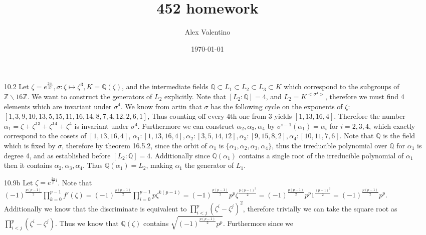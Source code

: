 \documentclass[12pt, letterpaper]{article}
\date{\today}
\author{Alex Valentino}
\title{452 homework}
\newcommand{\Z}{\mathbb{Z}}
\newcommand{\Q}{\mathbb{Q}}
\begin{document}
\begin{enumerate}
	\item[10.2] Let $\zeta = e^{\frac{2\pi i}{17}},
	\sigma : \zeta \mapsto \zeta^3, K = \Q(\zeta)$,
	and the intermediate fields $\Q \subset L_1 \subset L_2 \subset L_3 \subset K$ which correspond to the subgroups of $\Z \backslash 16 \Z$.
	We want to construct the generators of $L_2$ explicitly.  
	Note that $[L_2:\Q] = 4$, and $L_2 = K^{<\sigma^4>}$, therefore
	we must find 4 elements which are invariant under $\sigma^4$.
	We know from artin that $\sigma$ has the following cycle on 
	the exponents of $\zeta$: 
	$[1, 3, 9, 10, 13, 5, 15, 11, 16, 14, 8, 7, 4, 12, 2, 6, 1]$,
	Thus counting off every 4th one from $3$ yields 
	$[1,13,16,4]$.  Therefore the number 
	$\alpha_1 = \zeta + \zeta^{13} + \zeta^{14} + \zeta^4$ is 
	invariant under $\sigma^4$.  Furthermore we can construct 
	$\alpha_2, \alpha_3, \alpha_4$ by $\sigma^{i-1}(\alpha_1) =
	\alpha_i$ for $i=2,3,4$, which exactly correspond to the 
	cosets of $[1,13,16,4]$, 
	$\alpha_1: [1,13,16,4], \alpha_2: [3, 5, 14, 12], 
	\alpha_3: [9, 15, 8, 2], \alpha_4: [10, 11, 7, 6]$.
	Note that $\Q$ is the field which is fixed by $\sigma$,
	therefore by theorem 16.5.2, since the orbit of $\alpha_1$ 
	is $\{\alpha_1,\alpha_2,\alpha_3,\alpha_4\}$, thus 
	the irreducible polynomial over $\Q$ for $\alpha_1$ is 
	degree 4, and as established before $[L_2:\Q] = 4$.  
	Additionally since $\Q(\alpha_1)$ contains a single root 
	of the irreducible polynomial of $\alpha_1$ then it contains 
	$\alpha_2,\alpha_3,\alpha_4$.  Thus $\Q(\alpha_1) = L_2$, 
	making $\alpha_1$ the generator of $L_1$.  
	\iffalse Note that
	in the intermediate field $L_1$ we have the elements 
	corresponding to $l_1: [1, 9, 13, 15, 16, 8, 4, 2]$ and 
	$l_2: [3, 10, 5, 11, 14, 7, 12, 6]$, therefore we 
	only need $\alpha_1, \alpha_2$ and we can obtain 
	$\alpha_3 = l_1 - \alpha_1, \alpha_4 = l_2 - \alpha_2$.  
	Thus the irreducible polynomial is $(x-\alpha_1)(x-\alpha_2)$.
	\fi
	\item[10.9b] Let $\zeta = e^{\frac{2\pi}{p}i}$.
	Note that $(-1)^{\frac{p(p-1)}{2}}\prod_{k=0}^{p-1} f'(\zeta) = (-1)^{\frac{p(p-1)}{2}}\prod_{i=0}^{p-1} p \zeta^{k(p-1)} = (-1)^{\frac{p(p-1)}{2}}p^p \zeta^{\frac{p(p-1)^2}{2}} = (-1)^{\frac{p(p-1)}{2}}p^p 1^{\frac{(p-1)^2}{2}} = (-1)^{\frac{p(p-1)}{2}} p^p$.   Additionally we know that the discriminate is equivalent 
	to $\prod_{i < j}^p (\zeta^i - \zeta^j)^2$, therefore trivially 
	we can take the square root as $\prod_{i < j}^p (\zeta^i - \zeta^j)$.  Thus we know that $\Q(\zeta)$ contains $\sqrt{(-1)^{\frac{p(p-1)}{2}} p^p}$.  Furthermore since we 

\end{enumerate}
\end{document}
